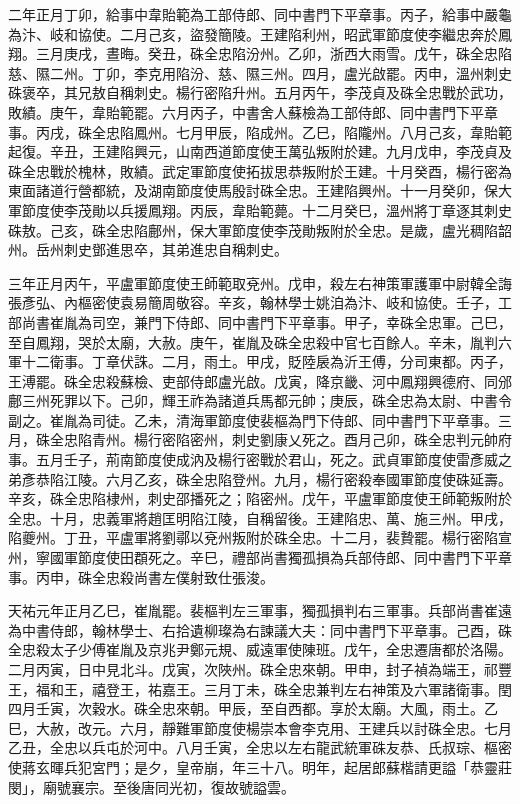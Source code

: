 \begin{pinyinscope}
 二年正月丁卯，給事中韋貽範為工部侍郎、同中書門下平章事。丙子，給事中嚴龜為汴、岐和協使。二月己亥，盜發簡陵。王建陷利州，昭武軍節度使李繼忠奔於鳳翔。三月庚戌，晝晦。癸丑，硃全忠陷汾州。乙卯，浙西大雨雪。戊午，硃全忠陷慈、隰二州。丁卯，李克用陷汾、慈、隰三州。四月，盧光啟罷。丙申，溫州刺史硃褒卒，其兄敖自稱刺史。楊行密陷升州。五月丙午，李茂貞及硃全忠戰於武功，敗績。庚午，韋貽範罷。六月丙子，中書舍人蘇檢為工部侍郎、同中書門下平章事。丙戌，硃全忠陷鳳州。七月甲辰，陷成州。乙巳，陷隴州。八月己亥，韋貽範起復。辛丑，王建陷興元，山南西道節度使王萬弘叛附於建。九月戊申，李茂貞及硃全忠戰於槐林，敗績。武定軍節度使拓拔思恭叛附於王建。十月癸酉，楊行密為東面諸道行營都統，及湖南節度使馬殷討硃全忠。王建陷興州。十一月癸卯，保大軍節度使李茂勛以兵援鳳翔。丙辰，韋貽範薨。十二月癸巳，溫州將丁章逐其刺史硃敖。己亥，硃全忠陷鄜州，保大軍節度使李茂勛叛附於全忠。是歲，盧光稠陷韶州。岳州刺史鄧進思卒，其弟進忠自稱刺史。



 三年正月丙午，平盧軍節度使王師範取兗州。戊申，殺左右神策軍護軍中尉韓全誨張彥弘、內樞密使袁易簡周敬容。辛亥，翰林學士姚洎為汴、岐和協使。壬子，工部尚書崔胤為司空，兼門下侍郎、同中書門下平章事。甲子，幸硃全忠軍。己巳，至自鳳翔，哭於太廟，大赦。庚午，崔胤及硃全忠殺中官七百餘人。辛未，胤判六軍十二衛事。丁章伏誅。二月，雨土。甲戌，貶陸扆為沂王傅，分司東都。丙子，王溥罷。硃全忠殺蘇檢、吏部侍郎盧光啟。戊寅，降京畿、河中鳳翔興德府、同邠鄜三州死罪以下。己卯，輝王祚為諸道兵馬都元帥；庚辰，硃全忠為太尉、中書令副之。崔胤為司徒。乙未，清海軍節度使裴樞為門下侍郎、同中書門下平章事。三月，硃全忠陷青州。楊行密陷密州，刺史劉康乂死之。酉月己卯，硃全忠判元帥府事。五月壬子，荊南節度使成汭及楊行密戰於君山，死之。武貞軍節度使雷彥威之弟彥恭陷江陵。六月乙亥，硃全忠陷登州。九月，楊行密殺奉國軍節度使硃延壽。辛亥，硃全忠陷棣州，刺史邵播死之；陷密州。戊午，平盧軍節度使王師範叛附於全忠。十月，忠義軍將趙匡明陷江陵，自稱留後。王建陷忠、萬、施三州。甲戌，陷夔州。丁丑，平盧軍將劉鄩以兗州叛附於硃全忠。十二月，裴贄罷。楊行密陷宣州，寧國軍節度使田頵死之。辛巳，禮部尚書獨孤損為兵部侍郎、同中書門下平章事。丙申，硃全忠殺尚書左僕射致仕張浚。



 天祐元年正月乙巳，崔胤罷。裴樞判左三軍事，獨孤損判右三軍事。兵部尚書崔遠為中書侍郎，翰林學士、右拾遺柳璨為右諫議大夫：同中書門下平章事。己酉，硃全忠殺太子少傅崔胤及京兆尹鄭元規、威遠軍使陳班。戊午，全忠遷唐都於洛陽。二月丙寅，日中見北斗。戊寅，次陜州。硃全忠來朝。甲申，封子禎為端王，祁豐王，福和王，禧登王，祐嘉王。三月丁未，硃全忠兼判左右神策及六軍諸衛事。閏四月壬寅，次穀水。硃全忠來朝。甲辰，至自西都。享於太廟。大風，雨土。乙巳，大赦，改元。六月，靜難軍節度使楊崇本會李克用、王建兵以討硃全忠。七月乙丑，全忠以兵屯於河中。八月壬寅，全忠以左右龍武統軍硃友恭、氏叔琮、樞密使蔣玄暉兵犯宮門；是夕，皇帝崩，年三十八。明年，起居郎蘇楷請更謚「恭靈莊閔」，廟號襄宗。至後唐同光初，復故號謚雲。




\end{pinyinscope}
